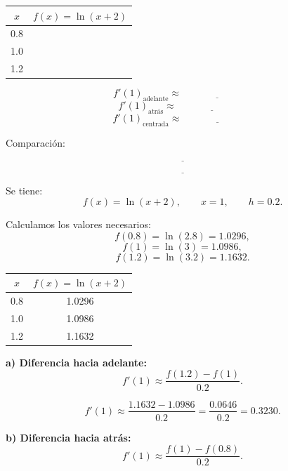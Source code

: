 \documentclass[11pt,respuestas,a4]{aleph-examen}
\begin{document}
\begin{preguntas}
\begin{center}
\begin{minipage}{0.45\textwidth}
\centering
\renewcommand{\arraystretch}{1.4}
\begin{tabular}{c|c}
\toprule
$x$ & $f(x)=\ln(x+2)$ \\
\midrule
0.8 &  \\
1.0 &  \\
1.2 &  \\
\bottomrule
\end{tabular}
\end{minipage}
\hfill
\begin{minipage}{0.48\textwidth}
\[
f'(1)_{\text{adelante}}\approx \underline{\hspace{3cm}}
\]
\[
f'(1)_{\text{atrás}}\approx \underline{\hspace{3cm}}
\]
\[
f'(1)_{\text{centrada}}\approx \underline{\hspace{3cm}}
\]
\end{minipage}
\end{center}

Comparación:

\[
\underline{\hspace{14cm}}
\]

\[
\underline{\hspace{14cm}}
\]

\begin{respuesta}
Se tiene:
\[
f(x)=\ln(x+2),
\qquad
x=1,
\qquad
h=0.2.
\]

Calculamos los valores necesarios:
\[
f(0.8)=\ln(2.8)=1.0296,
\]
\[
f(1)=\ln(3)=1.0986,
\]
\[
f(1.2)=\ln(3.2)=1.1632.
\]

\begin{center}
\renewcommand{\arraystretch}{1.4}
\begin{tabular}{c|c}
\toprule
$x$ & $f(x)=\ln(x+2)$ \\
\midrule
0.8 & 1.0296 \\
1.0 & 1.0986 \\
1.2 & 1.1632 \\
\bottomrule
\end{tabular}
\end{center}

\textbf{a) Diferencia hacia adelante:}
\[
f'(1)\approx \frac{f(1.2)-f(1)}{0.2}.
\]

\[
f'(1)\approx \frac{1.1632-1.0986}{0.2}
=\frac{0.0646}{0.2}=0.3230.
\]

\textbf{b) Diferencia hacia atrás:}
\[
f'(1)\approx \frac{f(1)-f(0.8)}{0.2}.
\]


\end{respuesta}
\end{preguntas}
\end{document}
